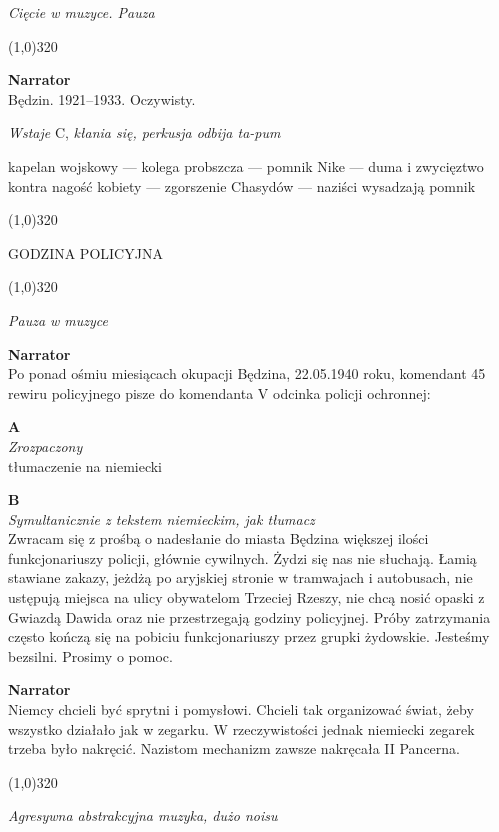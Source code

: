 \documentclass[11pt,a4paper,oneside]{article}
\begin{document}
{\color{light-gray} \emph{Cięcie w muzyce. Pauza}}


\line(1,0){320}


\textbf{Narrator}\\
Będzin. 1921--1933. Oczywisty. 

{\color{light-gray} \emph{Wstaje} C, \emph{kłania się, perkusja odbija
ta-pum}}

{\color{red} kapelan wojskowy --- kolega probszcza --- pomnik Nike --- duma
i zwycięztwo kontra nagość kobiety --- zgorszenie Chasydów --- naziści
wysadzają pomnik}

\line(1,0){320}

{\color{red}
GODZINA POLICYJNA
}

\line(1,0){320}

{\color{light-gray} \emph{Pauza w muzyce}}

\textbf{Narrator}\\
Po ponad ośmiu miesiącach okupacji Będzina, 22.05.1940 roku, komendant 45
rewiru policyjnego pisze do komendanta V odcinka policji ochronnej:

\textbf{A}\\
{\color{light-gray} \emph{Zrozpaczony}}\\
{\color{red} tłumaczenie na niemiecki}


\textbf{B}\\
{\color{light-gray} \emph{Symultanicznie z tekstem niemieckim, jak tłumacz}}\\
Zwracam się z prośbą o nadesłanie do miasta Będzina większej ilości
funkcjonariuszy policji, głównie cywilnych. Żydzi się nas nie słuchają. Łamią
stawiane zakazy, jeżdżą po aryjskiej stronie w tramwajach i autobusach, nie
ustępują miejsca na ulicy obywatelom Trzeciej Rzeszy, nie chcą nosić opaski
z Gwiazdą Dawida oraz nie przestrzegają godziny policyjnej. Próby zatrzymania
często kończą się na pobiciu funkcjonariuszy przez grupki żydowskie. Jesteśmy 
bezsilni. Prosimy o pomoc.


\textbf{Narrator}\\
Niemcy chcieli być sprytni i pomysłowi. Chcieli tak organizować świat, 
żeby wszystko działało jak w zegarku. W rzeczywistości jednak niemiecki 
zegarek trzeba było nakręcić. Nazistom mechanizm zawsze nakręcała
II Pancerna. 

\line(1,0){320}

{\color{light-gray} \emph{Agresywna abstrakcyjna muzyka, dużo noisu}}
\end{document}
